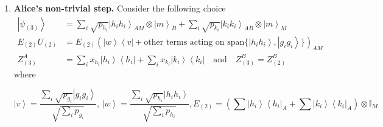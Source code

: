 \documentclass{article}
\begin{document}
\begin{enumerate}
        and $$(2)\quad U^\dagger_{(1)}\left(Z_{(2)}^{B}\otimes\mathbb{I}_{M}\right)U_{(1)}\ge\left(Z_{(1)}^{B}\otimes\mathbb{I}_{M}\right).$$
        \begin{proof}
          We have to prove that the above properties (1) and (2) are satisfied.
          (1) It follows trivially from the defining action of $U_{(1)}$.\\
          (2) For ease of notation, let $U=U_{(1)}$ and note that $U^{\dagger}=U$,
          so that we can write 
          \begin{align*}
            &U\left(Z_{(2)}^{B}\otimes\mathbb{I}_{M}\right)U\\
            & =y\left(U\left(\mathbb{I}_{B}^{\{\vec{g},m\}}\otimes\mathbb{I}_{M}^{\{\vec{g},m\}}\right)U+U\underbrace{\left(\mathbb{I}_{B}^{\{\vec{g},m\}}\otimes\mathbb{I}_{M}^{\{\vec{k},\vec{h}\}}\right)}_{\text{outside }U\text{'s action space}}U\right)+U\underbrace{\left(\sum y_{k_{i}}\left|k_{i}\right\rangle \left\langle k_{i}\right|\otimes\mathbb{I}\right)}_{\text{outside }U\text{'s action space}}U \\ &=Z_{(2)}\otimes\mathbb{I}_{M}\ge Z_{(1)}\otimes\mathbb{I}_{M}
          \end{align*}
          so long\footnote{By the action space of $U$ we mean the space where $U$ acts non-trivially.} as $y\ge y_{g_{i}}$, which is guaranteed by the choice of
          $y$.
        \end{proof}
  \item \textbf{Alice's non-trivial step. }Consider the following choice
        \begin{align*}
          \left|\psi_{(3)}\right\rangle & =\sum_{i}\sqrt{p_{h_{i}}}\left|h_{i}h_{i}\right\rangle _{AM}\otimes\left|m\right\rangle _{B}+\sum_{i}\sqrt{p_{k_{i}}}\left|k_{i}k_{i}\right\rangle _{AB}\otimes\left|m\right\rangle _{M} \\
          E_{(2)}U_{(2)}                & =E_{(2)}\left(\left|w\right\rangle \left\langle v\right|+\text{other terms acting on span\{}\left|h_{i}h_{i}\right\rangle ,\left|g_{i}g_{i}\right\rangle \}\right)_{AM}                  \\
          Z_{(3)}^{A}                   & =\sum_{i}x_{h_{i}}\left|h_{i}\right\rangle \left\langle h_{i}\right|+\sum_{i}x_{k_{i}}\left|k_{i}\right\rangle \left\langle k_{i}\right|\ \ \ \text{ and }\ \ \
          Z_{(3)}^{B}  =Z_{(2)}^{B}
        \end{align*}
        where \begin{footnotesize}
          \begin{displaymath}\left|v\right\rangle =\frac{\sum_{i}\sqrt{p_{g_{i}}}\left|g_{i}g_{i}\right\rangle }{\sqrt{\sum_{i}p_{g_{i}}}},\,\left|w\right\rangle =\frac{\sum_{i}\sqrt{p_{h_{i}}}\left|h_{i}h_{i}\right\rangle }{\sqrt{\sum_{i}p_{h_{i}}}},
            E_{(2)}=\left(\sum\left|h_{i}\right\rangle \left\langle h_{i}\right|_{A}+\sum\left|k_{i}\right\rangle \left\langle k_{i}\right|_{A}\right)\otimes\mathbb{I}_{M}
          \end{displaymath}


\end{footnotesize}
\end{enumerate}
\end{document}
